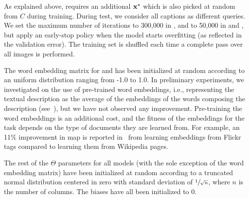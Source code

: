 As explained above, \sparsettv{} requires an additional $\mathbf{x}^\star$ which is also picked at random from $C$ during training.
During test, we consider all captions as different queries.
We set the maximum number of iterations to 300,000 in \sparsettv{}, and to 50,000 in \densettv{} and \widedeepttv{}, but apply an early-stop policy when the model starts overfitting (as reflected in the validation error).
The training set is shuffled each time a complete pass over all images is performed.

The word embedding matrix for \densettv{} and \widedeepttv{} has been initialized at random according to an uniform distribution ranging from -1.0 to 1.0.
In preliminary experiments, we investigated on the use of pre-trained word embeddings, i.e.,  representing the textual description as the average of the embeddings of the words composing the description (see~\cite{dong2018predicting}), but we have not observed any improvement.
Pre-training the word embeddings is an additional cost, and the fitness of the embeddings for the task depends on the type of documents they are learned from.
For example, an 11\% improvement in \gls{map} is reported in~\cite{cappallo2015image2emoji} from learning embeddings from Flickr tags compared to learning them from Wikipedia pages.

The rest of the $\Theta$ parameters for all models (with the sole exception of the word embedding matrix) have been initialized at random according to a truncated normal distribution centered in zero with standard deviation of $\sfrac{1}{\sqrt{n}}$, where $n$ is the number of columns.
The biases have all been initialized to 0.


